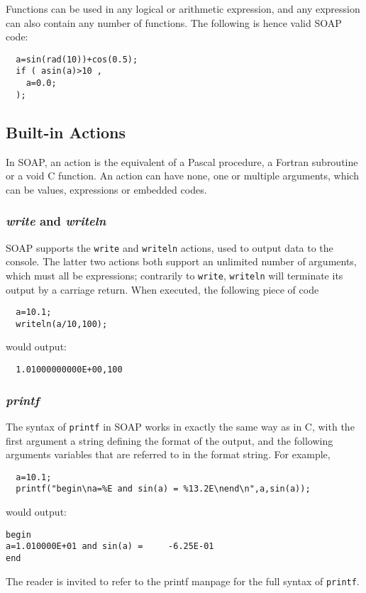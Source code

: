 \documentclass{warpdoc}
\begin{document}
Functions can be used in any logical or arithmetic expression,
and any expression can also contain any number of functions. The
following is hence valid SOAP code:
%
\begin{verbatim}
  a=sin(rad(10))+cos(0.5);
  if ( asin(a)>10 ,
    a=0.0;
  );
\end{verbatim}
%


\subsection{Built-in Actions}

In SOAP, an action is the equivalent of a Pascal procedure, a Fortran subroutine
or a void C function. An action can have none, one or multiple arguments,
which can be values, expressions or embedded codes.

\subsubsection{\emph{write} and \emph{writeln}}

SOAP supports the \verb|write| and \verb|writeln| actions, used to output
data to the console. The latter two actions both support an unlimited number
of arguments, which must all be expressions; contrarily to
\verb|write|, \verb|writeln| will terminate its output by a carriage return.
When executed, the following piece of code
%
\begin{verbatim}
  a=10.1;
  writeln(a/10,100);
\end{verbatim}
%
would output:
%
\begin{verbatim}
  1.01000000000E+00,100
\end{verbatim}
%

\subsubsection{\emph{printf}}

The syntax of \verb|printf| in
SOAP works in exactly the same way as in C, with the first argument a string
defining the format of the output, and the following arguments variables
that are referred to in the format string. For example,
%
\begin{verbatim}
  a=10.1;
  printf("begin\na=%E and sin(a) = %13.2E\nend\n",a,sin(a));
\end{verbatim}
%
would output:
%
\begin{verbatim}
begin
a=1.010000E+01 and sin(a) =     -6.25E-01
end
\end{verbatim}
%
The reader is invited to refer to the printf manpage for the full syntax of \verb|printf|.
\end{document}
